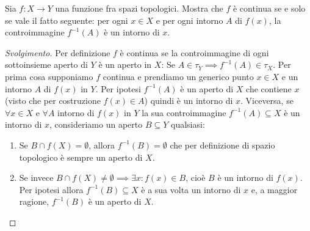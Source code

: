 \documentclass[a4paper, 12pt, italian]{article}
\begin{document}
\begin{exercise}
Sia $f: X \to Y$ una funzione fra spazi topologici. Mostra che $f$ è
continua se e solo se vale il fatto seguente: per ogni $x \in X$ e per ogni
intorno $A$ di $f(x)$, la controimmagine $f^{-1}(A)$ è un intorno di $x$.
\begin{proof}[Svolgimento]
Per definizione $f$ è continua se la controimmagine di ogni sottoinsieme
aperto di $Y$ è un aperto in $X$:
Se $A \in \tau_Y \implies f^{-1}(A) \in \tau_X$. Per prima cosa supponiamo
$f$ continua e prendiamo un generico punto $x \in X$ e un intorno $A$ di $f(x)$
in $Y$. Per ipotesi $f^{-1}(A)$ è un aperto di $X$ che contiene $x$ (visto
che per costruzione $f(x) \in A$) quindi è un intorno di $x$.\newline
Viceversa, se $\forall x \in X$ e $\forall A$ intorno di $f(x)$ in $Y$ la sua
controimmagine $f^{-1}(A) \subseteq X$ è un intorno di $x$, consideriamo un
aperto $B \subseteq Y$ qualsiasi:
\begin{enumerate}
\item Se $B \cap f(X) = \emptyset$, allora $f^{-1}(B) = \emptyset$ che per
definizione di spazio topologico è sempre un aperto di $X$.
\item Se invece $B \cap f(X) \neq \emptyset \implies \exists x: f(x) \in B$,
cioè $B$ è un intorno di $f(x)$. Per ipotesi allora $f^{-1}(B) \subseteq X$ 
è a sua volta un intorno di $x$ e, a maggior ragione, $f^{-1}(B)$ è un
aperto di $X$.
\end{enumerate}
\end{proof}
\end{exercise}
\end{document}

